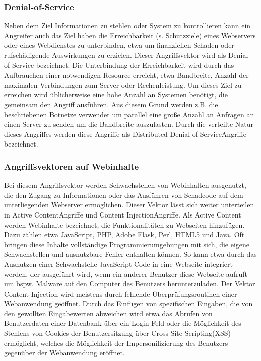 \subsubsection{Denial-of-Service}
Neben dem Ziel Informationen zu stehlen oder System zu kontrollieren kann ein Angreifer auch das Ziel haben die Erreichbarkeit (s. Schutzziele) eines Webservers oder eines Webdienstes zu unterbinden, etwa um finanziellen Schaden oder rufschädigende Auswirkungen zu erzielen. Dieser Angriffsvektor wird als \glqq Denial-of-Service \grqq  bezeichnet. Die Unterbindung der Erreichbarkeit wird durch das Aufbrauchen einer notwendigen Resource erreicht, etwa Bandbreite, Anzahl der maximalen Verbindungen zum Server oder Rechenleistung. Um dieses Ziel zu erreichen wird üblicherweise eine hohe Anzahl an Systemen benötigt, die gemeinsam den Angriff ausführen. Aus diesem Grund werden z.B. die beschriebenen Botnetze verwendet um parallel eine große Anzahl an Anfragen an einen Server zu senden um die Bandbreite auszulasten. Durch die verteilte Natur dieses Angriffes werden diese Angriffe als \glqq Distributed Denial-of-Service\grqq  Angriffe bezeichnet\citep{Campbell2016}.

\subsubsection{Angriffsvektoren auf Webinhalte}
Bei diesem Angriffsvektor werden Schwachstellen von Webinhalten ausgenutzt, die den Zugang zu Informationen oder das Ausführen von Schadcode auf dem unterliegenden Webserver ermöglichen. Dieser Vektor lässt sich weiter unterteilen in \glqq Active Content\grqq  Angriffe und \glqq Content Injection\grqq  Angriffe. 
Als Active Content werden Webinhalte bezeichnet, die Funktionalitäten zu Webseiten hinzufügen. Dazu zählen etwa JavaScript, PHP, Adobe Flask, Perl, HTML5 und Java. Oft bringen diese Inhalte vollständige Programmierumgebungen mit sich, die eigene Schwachstellen und ausnutzbare Fehler enthalten können. So kann etwa durch das Ausnutzen einer Schwachstelle JavaScript Code in eine Webseite integriert werden, der ausgeführt wird, wenn ein anderer Benutzer diese Webseite aufruft um bspw. Malware auf den Computer des Benutzers herunterzuladen. 
Der Vektor Content Injection wird meistens durch fehlende Überprüfungsroutinen einer Webanwendung geöffnet. Durch das Einfügen von spezifischen Eingaben, die von den gewollten Eingabewerten abweichen wird etwa das Abrufen von Benutzerdaten einer Datenbank über ein Login-Feld oder die Möglichkeit des Stehlens von Cookies der Benutzersitzung über \glqq Cross-Site Scripting\grqq  (XSS) ermöglicht, welches die Möglichkeit der Impersonifizierung des Benutzers gegenüber der Webanwendung eröffnet\citep{Campbell2016}.

